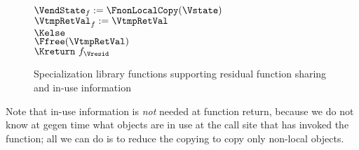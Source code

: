 \begin{docpart}
\begin{figure}[hbtp]
\begin{center}
{{\begin{pseudocode}
      $\VendState_f := \FnonLocalCopy(\Vstate)$ \\
      $\VtmpRetVal_f := \VtmpRetVal$ \-\\
    $\Kelse$ \+\\
      $\Ffree(\VtmpRetVal)$ \-\\
    $\Kreturn\ f_{\Vresid}$
\end{pseudocode}}}
    \caption{Specialization library functions supporting
      residual function sharing and in-use information} 
    \label{fig:SLFFunctionSharingLibrary}
  \end{center}
\end{figure}
Note that in-use information is \emph{not} needed at
function return, because we do not know at gegen time what objects are 
in use at the call site that has invoked the function; all we can do
is to reduce the copying to copy only non-local objects.


\end{docpart}
